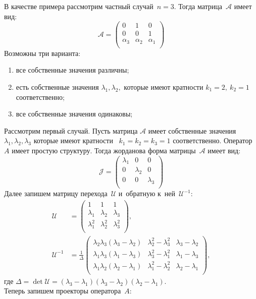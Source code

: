 В качестве примера рассмотрим частный случай~$n=3$. Тогда матрица~$\mathcal{A}$ имеет вид:
$$
 \mathcal{A} = 
 \begin{pmatrix}
  0 & 1 & 0\\
  0 & 0 & 1 \\
  \alpha_3 & \alpha_2 & \alpha_1 \\
 \end{pmatrix}
$$
Возможны три варианта:
\begin{enumerate}
\item все собственные значения различны;
\item есть собственные значения $\lambda_1, \lambda_2,$ которые имеют кратности ${k_1=2},~{k_2=1}$ соответственно; 
\item все собственные значения одинаковы;        
\end{enumerate}

Рассмотрим первый случай.
Пусть матрица $\mathcal{A}$ имеет собственные значения $\lambda_1, \lambda_2, \lambda_3$ которые имеют кратности~ $k_1=k_2=k_3=1$ соответственно. Оператор $A$ имеет простую структуру. Тогда жорданова форма матрицы~$\mathcal{A}$ имеет вид:
$$
 \mathcal{J} = 
 \begin{pmatrix}
  \lambda_1 & 0 & 0\\
  0 & \lambda_2 & 0 \\
  0 & 0 & \lambda_3 \\
 \end{pmatrix}
$$
Далее запишем матрицу перехода~$\mathcal{U}$ и~обратную к~ней~$\mathcal{U}^{-1}$:
$$
\begin{aligned}
 \mathcal{U} &= 
 \begin{pmatrix}
  	1 & 1 & 1\\
  	\lambda_1 & \lambda_2 & \lambda_3 \\
  	\lambda_1^2 & \lambda_2^2 & \lambda_3^2 \\
 \end{pmatrix}, \\
 \mathcal{U}^{-1} &= \frac{1}{\Delta} 
 \begin{pmatrix}
  	\lambda_2\lambda_3(\lambda_3-\lambda_2) & \lambda_2^2-\lambda_3^2 & \lambda_3-\lambda_2\\
  	\lambda_1\lambda_3(\lambda_1-\lambda_3) & \lambda_3^2-\lambda_1^2 & \lambda_1-\lambda_3\\
  	\lambda_1\lambda_2(\lambda_2-\lambda_1) & \lambda_1^2-\lambda_2^2 & \lambda_2-\lambda_1\\
 \end{pmatrix},
\end{aligned}
$$
где $\Delta = \det \mathcal{U} = (\lambda_3-\lambda_1)(\lambda_3-\lambda_2)(\lambda_2-\lambda_1).$ \\
Теперь запишем проекторы оператора~$A$:

